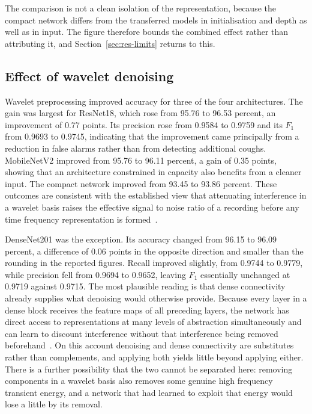\documentclass[pdflatex,sn-mathphys-num]{sn-jnl}
\begin{document}
The comparison is not a clean isolation of the representation, because the
compact network differs from the transferred models in initialisation and
depth as well as in input. The figure therefore bounds the combined effect
rather than attributing it, and Section~\ref{sec:res-limits} returns to this.

\subsection{Effect of wavelet denoising}\label{sec:res-denoise}

Wavelet preprocessing improved accuracy for three of the four architectures.
The gain was largest for ResNet18, which rose from 95.76 to 96.53 percent, an
improvement of 0.77 points. Its precision rose from 0.9584 to 0.9759 and its
$F_1$ from 0.9693 to 0.9745, indicating that the improvement came principally
from a reduction in false alarms rather than from detecting additional coughs.
MobileNetV2 improved from 95.76 to 96.11 percent, a gain of 0.35 points,
showing that an architecture constrained in capacity also benefits from a
cleaner input. The compact network improved from 93.45 to 93.86 percent.
These outcomes are consistent with the established view that attenuating
interference in a wavelet basis raises the effective signal to noise ratio of
a recording before any time frequency representation is
formed~\cite{mallat1989, donoho1995}.

DenseNet201 was the exception. Its accuracy changed from 96.15 to 96.09
percent, a difference of 0.06 points in the opposite direction and smaller
than the rounding in the reported figures. Recall improved slightly, from
0.9744 to 0.9779, while precision fell from 0.9694 to 0.9652, leaving $F_1$
essentially unchanged at 0.9719 against 0.9715. The most plausible reading is
that dense connectivity already supplies what denoising would otherwise
provide. Because every layer in a dense block receives the feature maps of all
preceding layers, the network has direct access to representations at many
levels of abstraction simultaneously and can learn to discount interference
without that interference being removed beforehand~\cite{huang2017}. On this
account denoising and dense connectivity are substitutes rather than
complements, and applying both yields little beyond applying either. There is
a further possibility that the two cannot be separated here: removing
components in a wavelet basis also removes some genuine high frequency
transient energy, and a network that had learned to exploit that energy would
lose a little by its removal.
\end{document}
